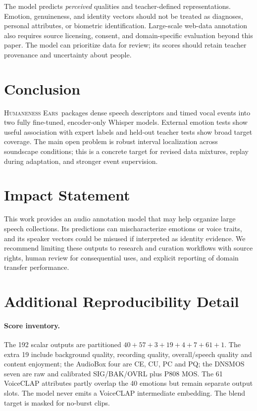 \documentclass{article}
\newcommand{\he}{\textsc{Humaneness Ears}}
\begin{document}
The model predicts \emph{perceived} qualities and teacher-defined representations. Emotion, genuineness, and identity vectors should not be treated as diagnoses, personal attributes, or biometric identification. Large-scale web-data annotation also requires source licensing, consent, and domain-specific evaluation beyond this paper. The model can prioritize data for review; its scores should retain teacher provenance and uncertainty about people.

\section{Conclusion}
\he\ packages dense speech descriptors and timed vocal events into two fully fine-tuned, encoder-only Whisper models. External emotion tests show useful association with expert labels and held-out teacher tests show broad target coverage. The main open problem is robust interval localization across soundscape conditions; this is a concrete target for revised data mixtures, replay during adaptation, and stronger event supervision.

\section*{Impact Statement}
This work provides an audio annotation model that may help organize large speech collections. Its predictions can mischaracterize emotions or voice traits, and its speaker vectors could be misused if interpreted as identity evidence. We recommend limiting these outputs to research and curation workflows with source rights, human review for consequential uses, and explicit reporting of domain transfer performance.




\appendix
\section{Additional Reproducibility Detail}
\paragraph{Score inventory.} The 192 scalar outputs are partitioned $40+57+3+19+4+7+61+1$. The extra 19 include background quality, recording quality, overall/speech quality and content enjoyment; the AudioBox four are CE, CU, PC and PQ; the DNSMOS seven are raw and calibrated SIG/BAK/OVRL plus P808 MOS. The 61 VoiceCLAP attributes partly overlap the 40 emotions but remain separate output slots. The model never emits a VoiceCLAP intermediate embedding. The blend target is masked for no-burst clips.
\end{document}
